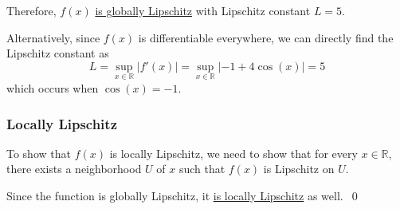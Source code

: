 Therefore, \( f(x) \) \underline{is globally Lipschitz} with Lipschitz constant \( L = 5 \).

\clearpage
Alternatively, since \( f(x) \) is differentiable everywhere, we can directly find the Lipschitz constant as
\[
    L = \sup_{x \in \mathbb{R}} \lvert f'(x) \rvert
    =
    \sup_{x \in \mathbb{R}} \lvert -1 + 4\cos(x) \rvert
    =
    5
\]
which occurs when \( \cos(x) = -1 \).

\subsubsection*{Locally Lipschitz}

To show that \( f(x) \) is locally Lipschitz, we need to show that for every \( x \in \mathbb{R} \), there exists a neighborhood \( U \) of \( x \) such that \( f(x) \) is Lipschitz on \( U \).

Since the function is globally Lipschitz, it \underline{is locally Lipschitz} as well.~\qed
